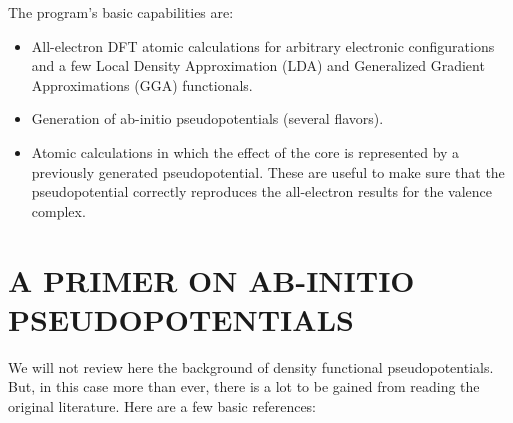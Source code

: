 \documentclass[11pt]{article}
\begin{document}
The program's basic capabilities are:

\begin{itemize}
\item All-electron DFT atomic calculations for arbitrary electronic
configurations and a few Local Density Approximation (LDA) and
Generalized Gradient Approximations (GGA) functionals.

\item Generation of ab-initio pseudopotentials (several flavors).

\item Atomic calculations in which the effect of the core is represented
by a previously generated pseudopotential. These are useful to make
sure that the pseudopotential correctly reproduces the all-electron
results for the valence complex.

\end{itemize}



\section{A PRIMER ON AB-INITIO PSEUDOPOTENTIALS}

We will not review here the background of density functional pseudopotentials.
But, in this case more than ever,
there is a lot to be gained from reading the original literature.
Here are a few basic references:
\end{document}
